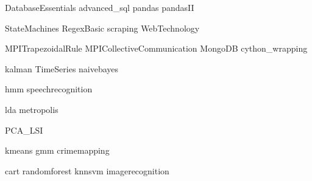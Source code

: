 \documentclass[nociteref]{SIAM-GH-book}
\begin{document}
{DatabaseEssentials}
{advanced_sql}
{pandas}
{pandasII}

{StateMachines}
{RegexBasic}
{scraping}
{WebTechnology}

{MPITrapezoidalRule}
{MPICollectiveCommunication}
{MongoDB}
{cython_wrapping}

{kalman}
{TimeSeries}
{naivebayes}

{hmm}
{speechrecognition}

{lda}
{metropolis}

{PCA_LSI}

{kmeans}
{gmm}
{crimemapping}

{cart}
{randomforest}
{knnsvm}
{imagerecognition}
\end{document}
